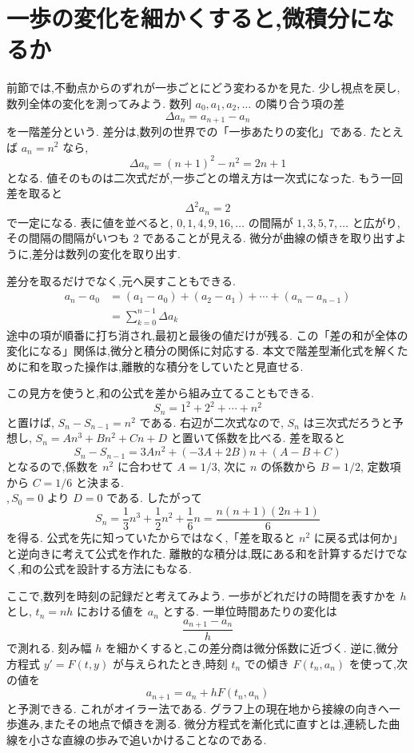 
\section{一歩の変化を細かくすると,微積分になるか}

前節では,不動点からのずれが一歩ごとにどう変わるかを見た.
少し視点を戻し,数列全体の変化を測ってみよう.
数列 $a_0,a_1,a_2,\ldots$ の隣り合う項の差
\[
  \Delta a_n=a_{n+1}-a_n
\]
を一階差分という.
差分は,数列の世界での「一歩あたりの変化」である.
たとえば $a_n=n^2$ なら,
\[
  \Delta a_n=(n+1)^2-n^2=2n+1
\]
となる.
値そのものは二次式だが,一歩ごとの増え方は一次式になった.
もう一回差を取ると
\[
  \Delta^2a_n=2
\]
で一定になる.
表に値を並べると,\,\,$0,1,4,9,16,\ldots$ の間隔が $1,3,5,7,\ldots$ と広がり,その間隔の間隔がいつも $2$ であることが見える.
微分が曲線の傾きを取り出すように,差分は数列の変化を取り出す.

差分を取るだけでなく,元へ戻すこともできる.
\[
  \begin{aligned}
    a_n-a_0
      &=(a_1-a_0)+(a_2-a_1)+\cdots+(a_n-a_{n-1})\\
      &=\sum_{k=0}^{n-1}\Delta a_k
  \end{aligned}
\]
途中の項が順番に打ち消され,最初と最後の値だけが残る.
この「差の和が全体の変化になる」関係は,微分と積分の関係に対応する.
本文で階差型漸化式を解くために和を取った操作は,離散的な積分をしていたと見直せる.

この見方を使うと,和の公式を差から組み立てることもできる.
\[
  S_n=1^2+2^2+\cdots+n^2
\]
と置けば,\,\,$S_n-S_{n-1}=n^2$ である.
右辺が二次式なので,\,\,$S_n$ は三次式だろうと予想し,\,\,$S_n=An^3+Bn^2+Cn+D$ と置いて係数を比べる.
差を取ると
\[
  S_n-S_{n-1}
  =3An^2+(-3A+2B)n+(A-B+C)
\]
となるので,係数を $n^2$ に合わせて $A=1/3$, 次に $n$ の係数から $B=1/2$, 定数項から $C=1/6$ と決まる.\\,\,$S_0=0$ より $D=0$ である.
したがって
\[
  S_n=\frac13n^3+\frac12n^2+\frac16n
  =\frac{n(n+1)(2n+1)}6
\]
を得る.
公式を先に知っていたからではなく,「差を取ると $n^2$ に戻る式は何か」と逆向きに考えて公式を作れた.
離散的な積分は,既にある和を計算するだけでなく,和の公式を設計する方法にもなる.

ここで,数列を時刻の記録だと考えてみよう.
一歩がどれだけの時間を表すかを $h$ とし,\,\,$t_n=nh$ における値を $a_n$ とする.
一単位時間あたりの変化は
\[
  \frac{a_{n+1}-a_n}{h}
\]
で測れる.
刻み幅 $h$ を細かくすると,この差分商は微分係数に近づく.
逆に,微分方程式 $y'=F(t,y)$ が与えられたとき,時刻 $t_n$ での傾き $F(t_n,a_n)$ を使って,次の値を
\[
  a_{n+1}=a_n+hF(t_n,a_n)
\]
と予測できる.
これがオイラー法である.
グラフ上の現在地から接線の向きへ一歩進み,またその地点で傾きを測る.
微分方程式を漸化式に直すとは,連続した曲線を小さな直線の歩みで追いかけることなのである.

